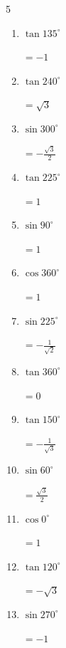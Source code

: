 \begin{multicols}{5}
\begin{enumerate}
  \item $\displaystyle \tan{135^\circ}$

        $\displaystyle =-1$

  \item $\displaystyle \tan{240^\circ}$

        $\displaystyle =\sqrt{3}$

  \item $\displaystyle \sin{300^\circ}$

        $\displaystyle =-\frac{\sqrt{3}}{2}$

  \item $\displaystyle \tan{225^\circ}$

        $\displaystyle =1$

  \item $\displaystyle \sin{90^\circ}$

        $\displaystyle =1$

  \item $\displaystyle \cos{360^\circ}$

        $\displaystyle =1$

  \item $\displaystyle \sin{225^\circ}$

        $\displaystyle =-\frac{1}{\sqrt{2}}$

  \item $\displaystyle \tan{360^\circ}$

        $\displaystyle =0$

\columnbreak %

  \item $\displaystyle \tan{150^\circ}$

        $\displaystyle =-\frac{1}{\sqrt{3}}$

  \item $\displaystyle \sin{60^\circ}$

        $\displaystyle =\frac{\sqrt{3}}{2}$

  \item $\displaystyle \cos{0^\circ}$

        $\displaystyle =1$

  \item $\displaystyle \tan{120^\circ}$

        $\displaystyle =-\sqrt{3}$

  \item $\displaystyle \sin{270^\circ}$

        $\displaystyle =-1$


\end{enumerate}
\end{multicols}
